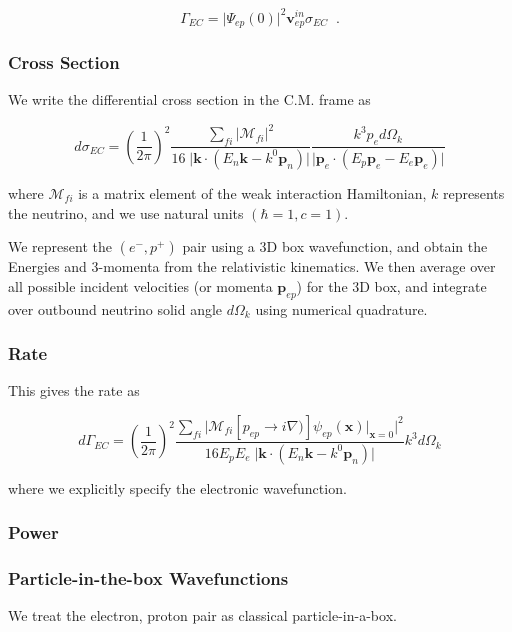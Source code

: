\documentclass[11pt]{amsart}
\begin{document}
$$\Gamma_{EC}=\big\vert\Psi_{ep}(0)\big\vert^{2}\mathbf{v}^{in}_{ep}\sigma_{EC}\;\;.$$

\subsubsection{Cross Section}

We write the differential cross section in the C.M. frame as

$$d\sigma_{EC}=\left(\dfrac{1}{2\pi}\right)^{2}\dfrac{\sum_{fi}\big\vert\mathcal{M}_{fi}\big\vert^{2}}{16\;\big\vert\mathbf{k}\cdot(E{_n}\mathbf{k}-k^{0}\mathbf{p}_{n})\big\vert}\dfrac{k^{3}p_{e}d\Omega_{k}}{\big\vert\mathbf{p}_{e}\cdot(E_{p}\mathbf{p}_{e}-E_{e}\mathbf{p}_{e})\big\vert}$$

where $\mathcal{M}_{fi}$ is a matrix element of the weak interaction Hamiltonian,  $k$ represents the neutrino, and we use natural units $(\hbar=1,c=1)$.

We represent the $(e^{-},p^{+})$ pair using a 3D box wavefunction, and obtain the Energies and 3-momenta from the relativistic kinematics.  We then average over all possible incident velocities (or momenta $\mathbf{p}_{ep}$) for the 3D box, and integrate over outbound neutrino solid angle $d\Omega_{k}$ using numerical quadrature.

\subsubsection{Rate}

This gives the rate as

$$d\Gamma_{EC}=\left(\dfrac{1}{2\pi}\right)^{2}\dfrac{\sum_{fi}\big\vert\mathcal{M}_{fi}\left[p_{ep}\rightarrow i\nabla)\right]\psi_{ep}(\mathbf{x})\big\vert_{\mathbf{x}=0}\big\vert^{2}}{16E_{p}E_{e}\;\big\vert\mathbf{k}\cdot(E{_n}\mathbf{k}-k^{0}\mathbf{p}_{n})\big\vert}k^{3}d\Omega_{k}$$

where we explicitly specify the electronic wavefunction.

\subsubsection{Power}


\subsubsection{Particle-in-the-box Wavefunctions}


We treat the electron, proton pair as classical particle-in-a-box.
\end{document}
